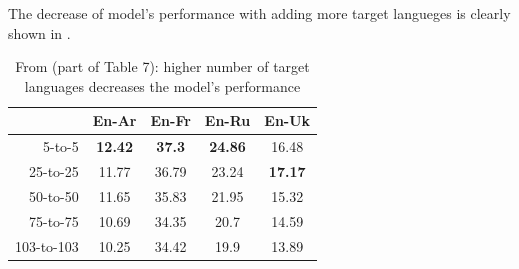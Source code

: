 The decrease of model's performance with adding more target langueges
is clearly shown in \cite{aharoni-etal-2019-massively}.


\begin{table}[h!]
\centering
\begin{tabular}{r|cccc}
\toprule
           & En-Ar & En-Fr & En-Ru & En-Uk \\
\midrule
5-to-5     & \textbf{12.42} & \textbf{37.3} & \textbf{24.86} &         16.48  \\
25-to-25   &         11.77  &         36.79 &         23.24  & \textbf{17.17} \\
50-to-50   &         11.65  &         35.83 &         21.95  &         15.32  \\
75-to-75   &         10.69  &         34.35 &         20.7   &         14.59  \\
103-to-103 &         10.25  &         34.42 &         19.9   &         13.89  \\
\bottomrule
\end{tabular}
\caption{From \citep{aharoni-etal-2019-massively} (part of Table 7): higher number of 
   target languages decreases the model's performance}
\label{tab:aharoni-2019-performance-drop}
\end{table}


